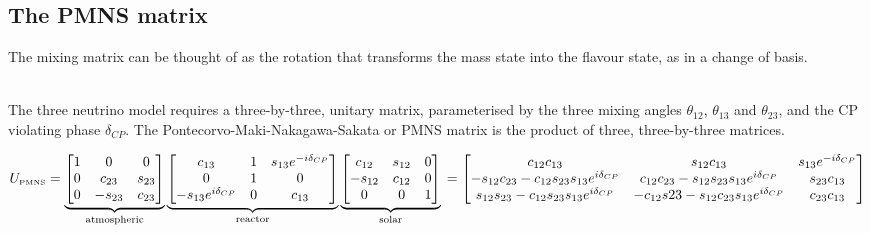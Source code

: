 \documentclass[12pt]{article}
\begin{document}
\subsection{The PMNS matrix}
The mixing matrix can be thought of as the rotation that transforms the mass state into the flavour state, as in a change of basis.
\begin{centre}
\begin{equation}
\begin{bmatrix}
\nu_{e}\\\nu_{\mu}\\\nu_{\tau}
\end{bmatrix}&=
\begin{bmatrix}
U_{e1}&U_{e2}&U_{e3}\\U_{\mu 1}&U_{\mu 2}&U_{\mu 3}\\U_{\tau 1}&U_{\tau 2}&U_{\tau 3}
\end{bmatrix}
\begin{bmatrix}
\nu_{1}\\\nu_{2}\\\nu_{3}
\end{bmatrix}
\end{equation}}
\end{centre}\\
The three neutrino model requires a three-by-three, unitary matrix, parameterised by the three mixing angles $\theta_{12}$, $\theta_{13}$ and $\theta_{23}$, and the CP violating phase $\delta_{CP}$. The Pontecorvo-Maki-Nakagawa-Sakata or PMNS matrix is the product of three, three-by-three matrices.
\begin{center}
\begin{equation}
U_{\text{{\tiny PMNS}}}=
\underbrace{
\begin{bmatrix}
1&0&0\\0&c_{23}&s_{23}\\0&-s_{23}&c_{23}
\end{bmatrix}
}_\text{atmospheric}
\underbrace{
\begin{bmatrix}
c_{13}&1&s_{13}e^{-i\delta_{CP}}\\0&1&0\\-s_{13}e^{i\delta_{CP}}&0&c_{13}
\end{bmatrix}
}_\text{reactor}
\underbrace{
\begin{bmatrix}
c_{12}&s_{12}&0\\-s_{12}&c_{12}&0\\0&0&1
\end{bmatrix}
}_\text{solar}\\\\
=\begin{bmatrix}
c_{12}c_{13} & s_{12}c_{13} & s_{13}e^{-i\delta_{CP}}\\
-s_{12}c_{23}-c_{12}s_{23}s_{13}e^{i\delta_{CP}} & c_{12}c_{23}-s_{12}s_{23}s_{13}e^{i\delta_{CP}}&s_{23}c_{13}\\
s_{12}s_{23}-c_{12}s_{23}s_{13}e^{i\delta_{CP}} & -c_{12}s{23}-s_{12}c_{23}s_{13}e^{i\delta_{CP}}&c_{23}c_{13}
\end{bmatrix}
\end{equation}
\end{center}
\end{document}
